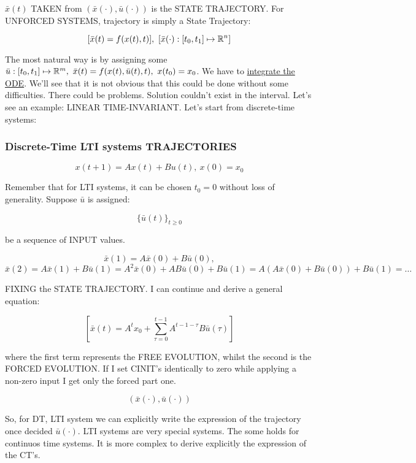 $\bar{x}(t)$ TAKEN from $(\bar{x}(\mathord{\cdot}), \bar{u}(\mathord{\cdot}))$ is the STATE TRAJECTORY. For UNFORCED SYSTEMS, trajectory is simply a State Trajectory: 

\[
	[\bar{x}(t) = f(x(t),t)],\ [\bar{x}(\mathord{\cdot}) : [t_0, t_1] \mapsto \R^n]
\]

The most natural way is by assigning some $\bar{u}: [t_0,t_1] \mapsto \mathbb{R}^m,\ \bar{x}(t) = f(x(t), \bar{u}(t), t),\ x(t_0) = x_0$. We have to \underline{integrate the ODE}. We'll see that it is not obvious that this could be done without some difficulties. There could be problems. Solution couldn't exist in the interval. Let's see an example: LINEAR TIME-INVARIANT. Let's start from discrete-time systems:

\subsubsection{Discrete-Time LTI systems TRAJECTORIES}

\[
	x(t+1) = Ax(t) + Bu(t),\ x(0) = x_0
\]

Remember that for LTI systems, it can be chosen $t_0 = 0$ without loss of generality. Suppose $\bar{u}$ is assigned:

\[
	\{ \bar{u}(t) \}_{t \geq 0}
\]

be a sequence of INPUT values.

\[
	\bar{x}(1) = A\bar{x}(0) + B\bar{u}(0),
\]
\[
	\bar{x}(2) = A\bar{x}(1) + B\bar{u}(1) = A^2\bar{x}(0) + AB\bar{u}(0) + B\bar{u}(1) = A(A\bar{x}(0) + B\bar{u}(0)) + B\bar{u}(1) = \dots
\]

FIXING the STATE TRAJECTORY. I can continue and derive a general equation:

\begin{equation}
\label{dtsysevo}
[\bar{x}(t) = A^tx_0 + \sum_{\tau = 0}^{t-1}{A^{t-1-\tau}B\bar{u}(\tau)}]
\end{equation}

where the first term represents the FREE EVOLUTION, whilst the second is the FORCED EVOLUTION. If I set CINIT's identically to zero while applying a non-zero input I get only the forced part one. 

\[
	(\bar{x}(\mathord{\cdot}), \bar{u}(\mathord{\cdot}))
\]

So, for DT, LTI system we can explicitly write the expression of the trajectory once decided $\bar{u}(\mathord{\cdot})$. LTI systems are very special systems. The some holds for continuos time systems. It is more complex to derive explicitly the expression of the CT's.

